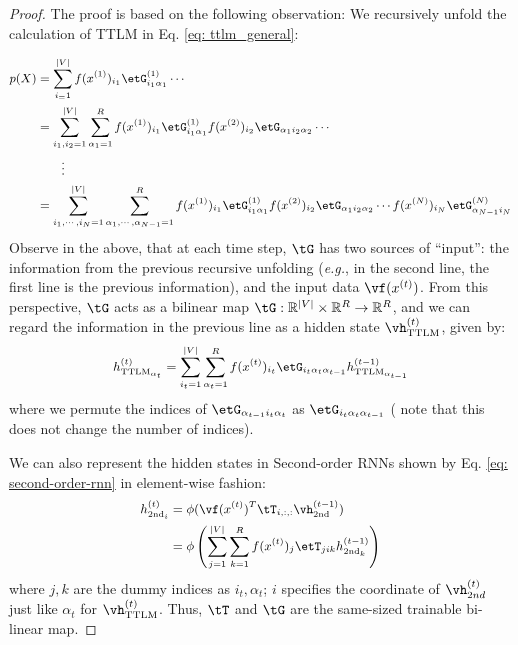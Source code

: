 \begin{proof} The proof is based on the following observation: We recursively unfold the calculation of TTLM in Eq. \ref{eq: ttlm_general}: 

\begin{equation} \small
\begin{aligned}
\label{eq: TTLM_unfold}
p(X) &= \sum_{{i_ = 1}}^{|V|} f(x^{(1)})_{i_1}\etG^{(1)}_{i_1\alpha_{1}}  \cdots \\
&= \sum_{{i_1,i_2 = 1}}^{|V|} \sum_{\alpha_1 = 1}^R   f(x^{(1)})_{i_1}\etG^{(1)}_{i_1\alpha_{1}} f(x^{(2)})_{i_2} \etG_{\alpha_{1}i_2\alpha_{2}} \cdots  \\
&  \quad\quad\vdots \\
&= \sum_{i_1, \cdots, i_N = 1}^{|V|} 
    \sum_{\alpha_1, \cdots ,\alpha_{N-1} =1}^{R}  f(x^{(1)})_{i_1}\etG^{(1)}_{i_1\alpha_1}
    f(x^{(2)})_{i_2}\etG_{\alpha_1i_2\alpha_2} \cdots f(x^{(N)})_{i_N}\etG^{(N)}_{\alpha_{N-1}i_N}   \\
\end{aligned}
\end{equation}
%
Observe in the above, that at each time step,
$\tG$ has two sources of ``input'': the information from the previous recursive unfolding (\textit{e.g.}, in the second line, the first line is the previous information), and the input data $\vf(x^{(t)})$. 
From this perspective, $\tG$ acts as a bilinear map $\tG: \mathbb{R}^{|V|} \times \mathbb{R}^R \rightarrow \mathbb{R}^R $, and we can regard the information in the previous line as a hidden state $\vh^{(t)}_\text{TTLM}$, given by: 
%
\begin{equation} \small
\begin{split}
    \label{eq: ttlm cell}
    h^{(t)}_{\textrm{TTLM}_{\alpha_{t}}}
    & = \sum_{{i_t = 1}}^{|V|} \sum_{{\alpha_t = 1}}^{R} f(x^{(t)})_{i_t}\etG_{i_t\alpha_{t}\alpha_{t-1}}  h^{(t-1)}_{\textrm{TTLM}_{\alpha_{t-1}}} \\
\end{split}
\end{equation}
%
where we permute the indices  of  $\etG_{\alpha_{t-1}i_t\alpha_{t}}$ as $\etG_{i_t\alpha_{t}\alpha_{t-1}}$  ( note that this does not change the number of indices). 

We can also represent the hidden states in Second-order RNNs shown by Eq. \ref{eq: second-order-rnn} in element-wise fashion:
%
\begin{equation} \small
\begin{split}
    \label{eq: second_element}
    h^{(t)}_{\textrm{2nd}_i}
    &= \phi(\vf(x^{(t)})^T \tT_{i, :, :}\vh^{(t-1)}_\textrm{2nd}) \\
    &= \phi\left(\sum^{|V|}_{j=1}\sum^{R}_{k=1} f(x^{(t)})_j\etT_{jik} h^{(t-1)}_{\textrm{2nd}_{k}}\right) \\
\end{split} 
\end{equation}
%
where $j,k$ are the dummy indices as $i_t, \alpha_{t}$;  $i$ specifies the coordinate of $\vh^{(t)}_{2nd}$ just like  $\alpha_t$ for $\vh^{(t)}_\text{TTLM}$. Thus,  $\tT$ and $\tG$ are the same-sized trainable bi-linear map. 


\end{proof}
